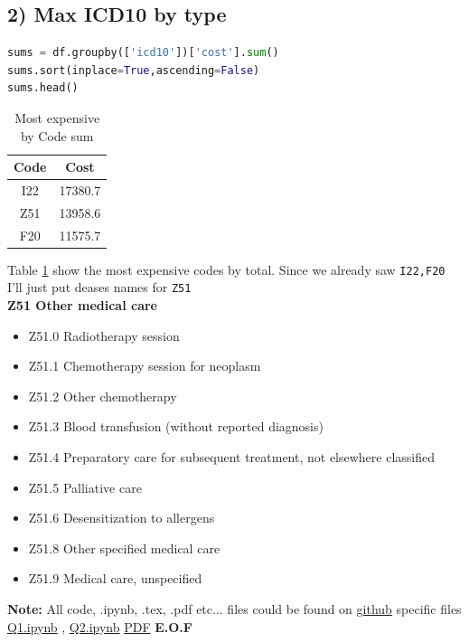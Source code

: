\documentclass[10pt]{article}
\begin{document}
\subsection*{2) Max ICD10 by type}
\begin{lstlisting}[language=python]
sums = df.groupby(['icd10'])['cost'].sum()
sums.sort(inplace=True,ascending=False)
sums.head()
\end{lstlisting}
\begin{table}[H]
\center
\begin{tabular}{|c|c|}
\hline
\textbf{Code}&\textbf{Cost}\\
\hline
I22   & 17380.7\\
\hline
Z51   & 13958.6\\
\hline
F20   & 11575.7\\
\hline
\end{tabular}
\caption{Most expensive by Code sum\label{table:4}}
\end{table}
Table \ref{table:4} show the most expensive codes by total. Since we already saw \texttt{I22,F20} I'll just put deases names for \texttt{Z51}\\
\textbf{Z51 Other medical care}
\begin{itemize}
\item Z51.0 Radiotherapy session
\item Z51.1 Chemotherapy session for neoplasm
\item Z51.2 Other chemotherapy
\item Z51.3 Blood transfusion (without reported diagnosis)
\item Z51.4 Preparatory care for subsequent treatment, not elsewhere classified
\item Z51.5 Palliative care
\item Z51.6 Desensitization to allergens
\item Z51.8 Other specified medical care
\item Z51.9 Medical care, unspecified
\end{itemize}
\textbf{Note:} All code, .ipynb, .tex, .pdf etc... files could be found on \href{https://github.com/aqeel13932/BIO/tree/master/Pupils_HW}{github} specific files \href{https://github.com/aqeel13932/BIO/blob/master/Pupils_HW/Q1.ipynb}{Q1.ipynb} , \href{https://github.com/aqeel13932/BIO/blob/master/Pupils_HW/Q2.ipynb}{Q2.ipynb} \href{https://github.com/aqeel13932/BIO/blob/master/Pupils_HW/report.pdf}{PDF}
{\center \textbf{E.O.F\\ }}
\end{document}
